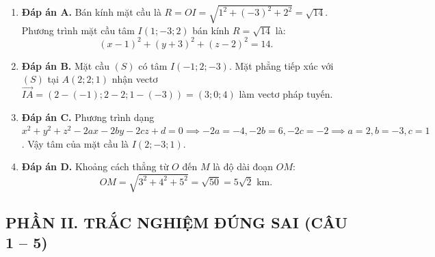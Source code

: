 \documentclass[12pt,a4paper]{article}
\begin{document}
\begin{enumerate}
\item \textbf{Đáp án A.}  
Bán kính mặt cầu là $R = OI = \sqrt{1^2 + (-3)^2 + 2^2} = \sqrt{14}$.  
Phương trình mặt cầu tâm $I(1; -3; 2)$ bán kính $R = \sqrt{14}$ là:
\[
(x - 1)^2 + (y + 3)^2 + (z - 2)^2 = 14.
\]

\item \textbf{Đáp án B.}  
Mặt cầu $(S)$ có tâm $I(-1; 2; -3)$. Mặt phẳng tiếp xúc với $(S)$ tại $A(2; 2; 1)$ nhận vectơ $\vec{IA} = (2 - (-1); 2 - 2; 1 - (-3)) = (3; 0; 4)$ làm vectơ pháp tuyến.

\item \textbf{Đáp án C.}  
Phương trình dạng $x^2 + y^2 + z^2 - 2ax - 2by - 2cz + d = 0 \implies -2a = -4, -2b = 6, -2c = -2 \implies a = 2, b = -3, c = 1$.  
Vậy tâm của mặt cầu là $I(2; -3; 1)$.

\item \textbf{Đáp án D.}  
Khoảng cách thẳng từ $O$ đến $M$ là độ dài đoạn $OM$:
\[
OM = \sqrt{3^2 + 4^2 + 5^2} = \sqrt{50} = 5\sqrt{2}\text{ km}.
\]
\end{enumerate}

\subsection*{PHẦN II. TRẮC NGHIỆM ĐÚNG SAI (CÂU 1 -- 5)}
\end{document}
